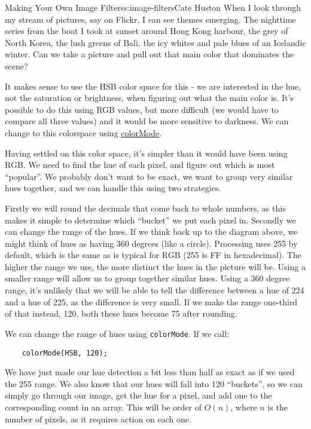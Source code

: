 \begin{aosachapter}{Making Your Own Image Filters}{s:image-filters}{Cate Huston}
When I look through my stream of pictures, say on Flickr, I can see
themes emerging. The nighttime series from the boat I took at sunset
around Hong Kong harbour, the grey of North Korea, the lush greens of
Bali, the icy whites and pale blues of an Icelandic winter. Can we take
a picture and pull out that main color that dominates the scene?

It makes sense to use the HSB color space for this - we are interested
in the hue, not the saturation or brightness, when figuring out what the
main color is. It's possible to do this using RGB values, but more
difficult (we would have to compare all three values) and it would be
more sensitive to darkness. We can change to this colorspace using
\href{http://processing.org/reference/colorMode_.html}{colorMode}.

Having settled on this color space, it's simpler than it would have been
using RGB. We need to find the hue of each pixel, and figure out which
is most ``popular''. We probably don't want to be exact, we want to
group very similar hues together, and we can handle this using two
strategies.

Firstly we will round the decimals that come back to whole numbers, as
this makes it simple to determine which ``bucket'' we put each pixel in.
Secondly we can change the range of the hues. If we think back up to the
diagram above, we might think of hues as having 360 degrees (like a
circle). Processing uses 255 by default, which is the same as is typical
for RGB (255 is FF in hexadecimal). The higher the range we use, the
more distinct the hues in the picture will be. Using a smaller range
will allow us to group together similar hues. Using a 360 degree range,
it's unlikely that we will be able to tell the difference between a hue
of 224 and a hue of 225, as the difference is very small. If we make the
range one-third of that instead, 120, both these hues become 75 after
rounding.

We can change the range of hues using \texttt{colorMode}. If we call:

\begin{verbatim}
    colorMode(HSB, 120);
\end{verbatim}

We have just made our hue detection a bit less than half as exact as if
we used the 255 range. We also know that our hues will fall into 120
``buckets'', so we can simply go through our image, get the hue for a
pixel, and add one to the corresponding count in an array. This will be
order of $O(n)$, where $n$ is the number of pixels, as it requires
action on each one.


\end{aosachapter}
